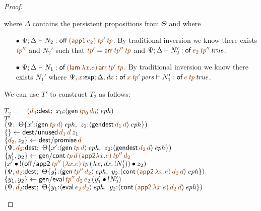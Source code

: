 \begin{proof}
\begin{description}
where $\Delta$ contains the persistent propositions from $\Theta$ and where
\begin{itemize}
\item[$\bullet$]  
  $\Psi; \Delta \vdash N_2 : {\sf off}\,\lf{({\sf app1}\,\lf{e_2})}\,\lf{{\it tp}'}\,\lf{{\it tp}}$. 
  By traditional inversion we know there exists $\lf{{\it tp}''}$
  and $N_2'$ such that
  $\lf{{\it tp}'} = \lf{{\sf arr}\,{\it tp}''\,{\it tp}}$ and
  $\Psi; \Delta \vdash N_2' : \isconc{{\sf of}\,\lf{e_2}\,\lf{{\it tp}''}}$.
\item[$\bullet$] $\Psi; \Delta \vdash N_1 : {\sf of}\,\lf{({\sf lam}\,\lambda
    x.e)}\,\lf{{\sf arr}\,{\it tp}'\,{\it tp}}$. By traditional inversion we know there 
    exists $N_1'$ where 
    $\Psi, \lf{x}{:}{\sf exp}; \Delta, {\it dx} : \ispers{{\sf of}\,\lf{x}\,\lf{\it
      tp'}} \vdash N_1' : \isconc{{\sf of}\,\lf{e}\,\lf{\it
        tp}}$.
\end{itemize}
We can use $T'$ to construct $T_2$ as follows: 

\begin{tabbing}
$T_2 = ~$ \= \qquad \= $(\lf{d_0}{:}{\sf dest}; ~ x_0{:}\iseph{\susp{{\sf gen}\,\lf{{\it tp}_0}\,\lf{d_0}}})$
\\
\> $T'$
\\
\>\> $\left(\Psi; ~
   \tackon{\Theta}
    {x'{:}\iseph{\susp{{\sf gen}\,\lf{{\it tp}}\,\lf{d}}}, ~
     z_1{:}\iseph{\susp{{\sf gendest}\,\lf{d_1}\,\lf{d}}}
    }\right)$
\\
\> $\trstep{}{{\sf dest/unused}\,\lf{d_1}\,\lf{d}\,z_1}$
\\
\> $\trstep{\lf{d_2}, z_2}{{\sf dest/promise}\,\lf{d}}$
\\
\>\> $\left(\Psi, \lf{d_2}{:}{\sf dest}; ~
   \tackon{\Theta}
    {x'{:}\iseph{\susp{{\sf gen}\,\lf{{\it tp}}\,\lf{d}}}, ~
     z_2{:}\iseph{\susp{{\sf gendest}\,\lf{d_2}\,\lf{d}}}
    }\right)$
\\
\> $\trstep{y_1',y_2}{{\sf gen/cont}\,\lf{{\it tp}}\,\lf{d}\,
      \lf{({\sf app2}\lambda x. e)}\,\lf{{\it tp}''}\,\lf{d_2}}$
\\
\> \qquad\qquad\qquad\qquad
     $(\tfuser{x'}{\tfuser{!({\sf off/app2}\,\lf{{\it tp}''}\,\lf{(\lambda x.e)}\,\lf{{\it tp}}\,(\lambda \lf{x}, {\it dx}.\,\tbangr{N_1'}))}{z_2}})$
\\
\>\> $\left(\Psi, \lf{d_2}{:}{\sf dest}; ~
   \tackon{\Theta}
    {y_1'{:}\iseph{\susp{{\sf gen}\,\lf{{\it tp}''}\,\lf{d_2}}}, ~
     y_2{:}\iseph{\susp{{\sf cont}\,\lf{({\sf app2}\,\lambda x.e)}\,\lf{d_2}\,\lf{d}}}
    }\right)$
\\
\> $\trstep{y_1, y_2}{{\sf gen/eval}\,\lf{{\it tp}''}\,\lf{d_2}\,\lf{e_2}\,
      (\tfuser{y_1'}{\tbangr{N_2'}})}$
\\
\>\> $\left(\Psi, \lf{d_2}{:}{\sf dest}; ~
   \tackon{\Theta}
    {y_1{:}\iseph{\susp{{\sf eval}\,\lf{e_2}\,\lf{d_2}}}, ~
     y_2{:}\iseph{\susp{{\sf cont}\,\lf{({\sf app2}\,\lambda x.e)}\,\lf{d_2}\,\lf{d}}}
    }\right)$
\end{tabbing}


\end{description}
\end{proof}
